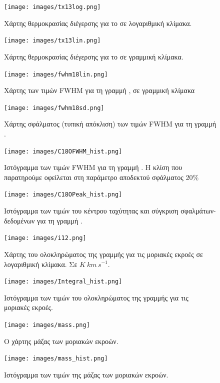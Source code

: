 \documentclass[a4paper,12pt]{memoir}
\begin{document}
\begin{figure}[h]
	\centering
	\texttt{[image: images/tx13log.png]}
	\caption{Χάρτης θερμοκρασίας διέγερσης για το  σε λογαριθμική κλίμακα.}
	\centering
	\texttt{[image: images/tx13lin.png]}
	\caption{Χάρτης θερμοκρασίας διέγερσης για το  σε γραμμική κλίμακα.}
\end{figure}


\begin{figure}[h]
	\centering
	\texttt{[image: images/fwhm18lin.png]}
	\caption{Χάρτης των τιμών FWHM για τη γραμμή , σε γραμμική κλίμακα}
	
	\centering
	\texttt{[image: images/fwhm18sd.png]}
	\caption{Χάρτης σφάλματος (τυπική απόκλιση) των τιμών FWHM για τη γραμμή .}
\end{figure}


\begin{figure}[h]
	\centering
	\texttt{[image: images/C18OFWHM\_hist.png]}
	\caption{Ιστόγραμμα των τιμών FWHM για τη γραμμή . Η κλίση που παρατηρούμε οφείλεται στη παράμετρο αποδεκτού σφάλματος 20\%}
	
	\centering
	\texttt{[image: images/C18OPeak\_hist.png]}
	\caption{Ιστόγραμμα των τιμών του κέντρου ταχύτητας και σύγκριση σφαλμάτων-δεδομένων για τη γραμμή .}
\end{figure}

\begin{figure}[h]
	\centering
	\texttt{[image: images/i12.png]}
	\caption{Χάρτης του ολοκληρώματος της γραμμής  για τις μοριακές εκροές σε λογαριθμική κλίμακα. Σε $K\ km\, s^{-1}$.}
\end{figure}

\begin{figure}[h]
	\centering
	\texttt{[image: images/Integral\_hist.png]}
	\caption{Ιστόγραμμα των τιμών του ολοκληρώματος της γραμμής  για τις μοριακές εκροές.}
\end{figure}


\begin{figure}[h]
	\centering
	\texttt{[image: images/mass.png]}
	\caption{Ο χάρτης μάζας των μοριακών εκροών.}
	\centering
	\texttt{[image: images/mass\_hist.png]}
	\caption{Ιστόγραμμα των τιμών της μάζας των μοριακών εκροών.}
\end{figure}


\end{document}

